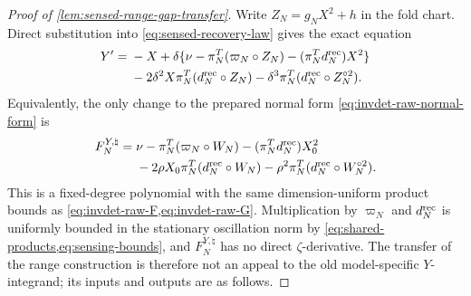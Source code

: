 \begin{proof}[Proof of \cref{lem:sensed-range-gap-transfer}]
Write \(Z_N=g_NX^2+h\) in the fold chart.  Direct substitution into
\cref{eq:sensed-recovery-law} gives the exact equation
\begin{align}
 Y'={}&-X+\delta\{\nu-\pi_N^T(\varpi_N\circ Z_N)
                    -(\pi_N^Td_N^{\rm rec})X^2\}\notag\\
 &-2\delta^2X\pi_N^T(d_N^{\rm rec}\circ Z_N)
   -\delta^3\pi_N^T(d_N^{\rm rec}\circ Z_N^{\circ2}).
                                                               \label{eq:sensing-exact-Y}
\end{align}
Equivalently, the only change to the prepared normal form
\cref{eq:invdet-raw-normal-form} is
\begin{align}
 F_N^{Y,\natural}={}&\nu-\pi_N^T(\varpi_N\circ W_N)
   -(\pi_N^Td_N^{\rm rec})X_0^2\notag\\
 &-2\rho X_0\pi_N^T(d_N^{\rm rec}\circ W_N)
   -\rho^2\pi_N^T(d_N^{\rm rec}\circ W_N^{\circ2}). \label{eq:sensing-raw-FY}
\end{align}
This is a fixed-degree polynomial with the same dimension-uniform product
bounds as \cref{eq:invdet-raw-F,eq:invdet-raw-G}.  Multiplication by
\(\varpi_N\) and \(d_N^{\rm rec}\) is uniformly bounded in the stationary
oscillation norm by \cref{eq:shared-products,eq:sensing-bounds}, and
\(F_N^{Y,\natural}\) has no direct \(\zeta\)-derivative.  The transfer of
the range construction is therefore not an appeal to the old
model-specific \(Y\)-integrand; its inputs and outputs are as follows.


\end{proof}
